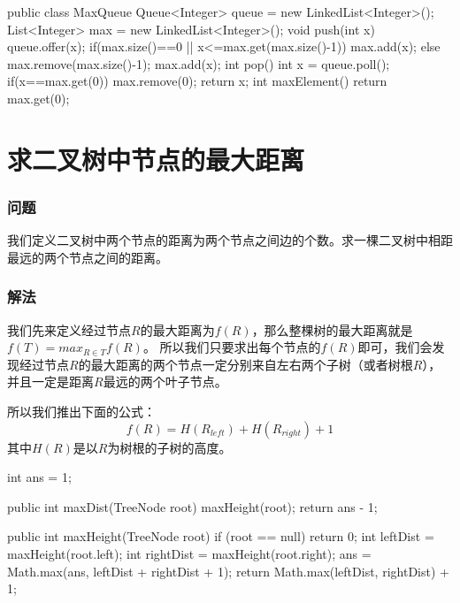 \begin{Codex}[label={[$O(1)+O(N)$]Chap03_07_MaxQueue.java}]
public class MaxQueue {
	Queue<Integer> queue = new LinkedList<Integer>();
	List<Integer> max = new LinkedList<Integer>();
	void push(int x) {
		queue.offer(x);
		if(max.size()==0 || x<=max.get(max.size()-1)) {
			max.add(x);
		} else {
			max.remove(max.size()-1);
			max.add(x);
		}
	}
	int pop() {
		int x = queue.poll();
		if(x==max.get(0)) {
			max.remove(0);
		}
		return x;
	}
	int maxElement() {
		return max.get(0);
	}
}
\end{Codex}

\section{求二叉树中节点的最大距离} %
\label{sec:max-dist-in-binary-tree}


\subsubsection{问题}
我们定义二叉树中两个节点的距离为两个节点之间边的个数。求一棵二叉树中相距最远的两个节点之间的距离。

\subsubsection{解法}
我们先来定义经过节点$R$的最大距离为$f(R)$，那么整棵树的最大距离就是$f(T)=max_{R\in T}{f(R)}$。
所以我们只要求出每个节点的$f(R)$即可，我们会发现经过节点$R$的最大距离的两个节点一定分别来自左右两个子树（或者树根$R$），并且一定是距离$R$最远的两个叶子节点。

所以我们推出下面的公式：
\[
f(R) = H(R_{left}) + H(R_{right}) + 1
\]
其中$H(R)$是以$R$为树根的子树的高度。

\begin{Codex}[label={[$O(N)+O(1)$]Chap03_08_MaxDistInBinaryTree.java}]
int ans = 1;

public int maxDist(TreeNode root) {
	maxHeight(root);
	return ans - 1;
}

public int maxHeight(TreeNode root) {
	if (root == null) {
		return 0;
	}
	int leftDist = maxHeight(root.left);
	int rightDist = maxHeight(root.right);
	ans = Math.max(ans, leftDist + rightDist + 1);
	return Math.max(leftDist, rightDist) + 1;
}
\end{Codex}


